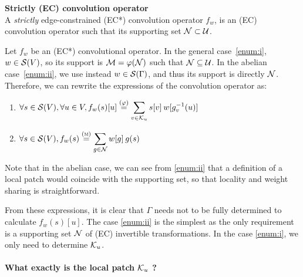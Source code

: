 \begin{definition}\textbf{Strictly (EC) convolution operator}\\
A \emph{strictly} edge-constrained (EC*) convolution operator $f_w$, is an (EC) convolution operator such that its supporting set $\cn \subset \cu$.
\end{definition}

Let $f_w$ be an (EC*) convolutional operator. In the general case~\ref{enum:i}, $w \in \cs(V)$, so its support is $\cm = \varphi(\cn)$ such that $\cn \subseteq \cu$. In the abelian case~\ref{enum:ii}, we use instead $w \in \cs(\Gamma)$, and thus its support is directly $\cn$.
Therefore, we can rewrite the expressions of the convolution operator as:
\begin{enumerate}[label=(\roman*)]
  \item $\forall s \in \cs(V), \forall u \in V, f_w(s)[u]
          \overset{(\varphi)}= \displaystyle\sum_{v \in \ck_u} s[v] \h{2} w[g_v^{-1}(u)]$ \label{enum:i}
  \item $\forall s \in \cs(V), f_w(s) \overset{(\M)}= \displaystyle\sum_{g \in \cn} w[g] \h{2} g(s)$ \label{enum:ii}
\end{enumerate}

\begin{remark}
Note that in the abelian case, we can see from \ref{enum:ii} that a definition of a local patch would coincide with the supporting set, so that locality and weight sharing is straightforward.
\end{remark}

From these expressions, it is clear that $\Gamma$ needs not to be fully determined to calculate $f_w(s)[u]$. The case \ref{enum:ii} is the simplest as the only requirement is a supporting set $\cn$ of (EC) invertible transformations. In the case \ref{enum:i}, we only need to determine $\ck_u$.

\paragraph{What exactly is the local patch $\ck_u$ ?}

\todo{}



